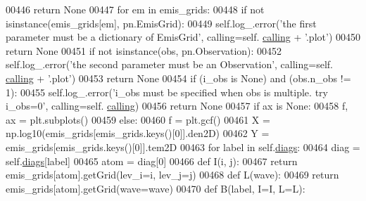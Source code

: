 \begin{DoxyCode}
00446             \textcolor{keywordflow}{return} \textcolor{keywordtype}{None}
00447         \textcolor{keywordflow}{for} em \textcolor{keywordflow}{in} emis\_grids:
00448             \textcolor{keywordflow}{if} \textcolor{keywordflow}{not} isinstance(emis\_grids[em], pn.EmisGrid):
00449                 self.log\_.error(\textcolor{stringliteral}{'the first parameter must be a dictionary of EmisGrid'}, calling=self.
      \hyperlink{classpyneb_1_1core_1_1diags_1_1_diagnostics_a07dce673fec8b2383ef411ab94b0b2fe}{calling} + \textcolor{stringliteral}{'.plot'})
00450                 \textcolor{keywordflow}{return} \textcolor{keywordtype}{None}
00451         \textcolor{keywordflow}{if} \textcolor{keywordflow}{not} isinstance(obs, pn.Observation):
00452             self.log\_.error(\textcolor{stringliteral}{'the second parameter must be an Observation'}, calling=self.
      \hyperlink{classpyneb_1_1core_1_1diags_1_1_diagnostics_a07dce673fec8b2383ef411ab94b0b2fe}{calling} + \textcolor{stringliteral}{'.plot'})
00453             \textcolor{keywordflow}{return} \textcolor{keywordtype}{None}
00454         \textcolor{keywordflow}{if} (i\_obs \textcolor{keywordflow}{is} \textcolor{keywordtype}{None}) \textcolor{keywordflow}{and} (obs.n\_obs != 1):
00455             self.log\_.error(\textcolor{stringliteral}{'i\_obs must be specified when obs is multiple. try i\_obs=0'}, calling=self.
      \hyperlink{classpyneb_1_1core_1_1diags_1_1_diagnostics_a07dce673fec8b2383ef411ab94b0b2fe}{calling})
00456             \textcolor{keywordflow}{return} \textcolor{keywordtype}{None}
00457         \textcolor{keywordflow}{if} ax \textcolor{keywordflow}{is} \textcolor{keywordtype}{None}:
00458             f, ax = plt.subplots()
00459         \textcolor{keywordflow}{else}:
00460             f = plt.gcf()
00461         X = np.log10(emis\_grids[emis\_grids.keys()[0]].den2D)
00462         Y = emis\_grids[emis\_grids.keys()[0]].tem2D
00463         \textcolor{keywordflow}{for} label \textcolor{keywordflow}{in} self.\hyperlink{classpyneb_1_1core_1_1diags_1_1_diagnostics_a0c0f7e36097677f61a6a14a0c3127b02}{diags}:
00464             diag = self.\hyperlink{classpyneb_1_1core_1_1diags_1_1_diagnostics_a0c0f7e36097677f61a6a14a0c3127b02}{diags}[label]
00465             atom = diag[0]
00466             \textcolor{keyword}{def }I(i, j):
00467                 \textcolor{keywordflow}{return} emis\_grids[atom].getGrid(lev\_i=i, lev\_j=j)
00468             \textcolor{keyword}{def }L(wave):
00469                 \textcolor{keywordflow}{return} emis\_grids[atom].getGrid(wave=wave)
00470             \textcolor{keyword}{def }B(label, I=I, L=L):

\end{DoxyCode}
